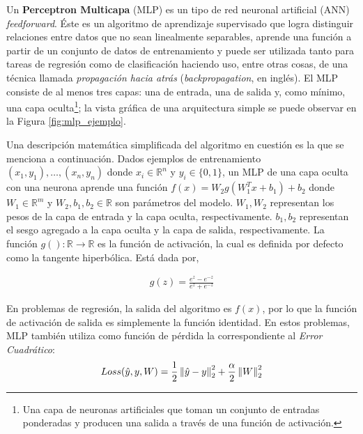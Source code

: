  \par Un \textbf{Perceptron Multicapa} (MLP)\cite{mlp_intro1, mlp_intro2} es un tipo
    de red neuronal artificial (ANN) \textit{feedforward}.
    Éste es un algoritmo de aprendizaje supervisado que logra distinguir
    relaciones entre datos que no sean linealmente separables, aprende una función
    a partir de un conjunto de datos de entrenamiento y puede ser
    utilizada tanto para tareas de regresión como de clasificación haciendo uso, entre
    otras cosas, de una técnica llamada \textit{propagación hacia atrás}\cite{backpropagation}
    (\textit{backpropagation}, en inglés).
    El MLP consiste de al menos tres capas: una de entrada, una de salida y,
    como mínimo, una capa oculta\footnote{Una capa de neuronas artificiales que toman un conjunto
    de entradas ponderadas y producen una salida a través de una función de activación.};
    la vista gráfica de una arquitectura simple se puede observar en la
    Figura \ref{fig:mlp_ejemplo}.

  \par Una descripción matemática simplificada del algoritmo en cuestión es la
    que se menciona a continuación.
    Dados ejemplos de entrenamiento $(x_{1}, y_{1}), \dots, (x_{n}, y_{n})$
    donde $x_{i} \in \mathbb{R}^{n}$ y $y_{i} \in \{0,1\}$, un MLP de una capa oculta
    con una neurona aprende una función $f(x) = W_{2}g(W_{1}^{T} x + b_{1}) + b_{2}$
    donde $W_{1} \in \mathbb{R}^{m}$ y $W_{2}, b_{1}, b_{2} \in \mathbb{R}$ son
    parámetros del modelo. $W_{1}, W_{2}$ representan los pesos de la capa de entrada y la
    capa oculta, respectivamente. $b_{1}, b_{2}$ representan el sesgo agregado a
    la capa oculta y la capa de salida, respectivamente. La función
    $g(): \mathbb{R} \rightarrow \mathbb{R}$ es la función de activación, la cual
    es definida por defecto como la tangente hiperbólica. Está dada por,

    \begin{align}
      g(z) = \frac{e^{z} - e^{-z}}{e^{z} + e^{-z}}
    \end{align}

    En problemas de regresión, la salida del algoritmo es $f(x)$, por lo que la
    función de activación de salida es simplemente la función identidad. En estos
    problemas, MLP también utiliza como función de pérdida la correspondiente
    al \textit{Error Cuadrático}:
    \begin{align}
      Loss(\hat{y}, y, W) = \frac{1}{2} \left\lVert\hat{y} - y\right\rVert^{2}_{2} + \frac{\alpha}{2} \left\lVert W\right\rVert^{2}_{2}
    \end{align}



